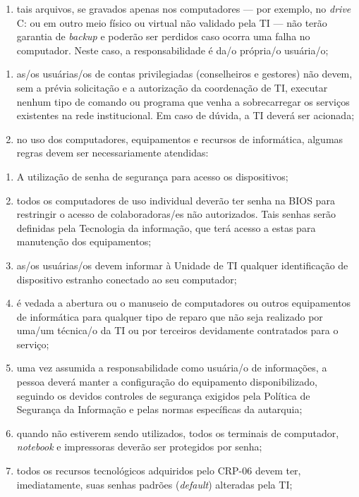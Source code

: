 \documentclass[openright, twoside, a4paper]{memoir}
\begin{document}
\begin{enumerate}
    \begin{enumerate}
      \def\labelenumii{\roman{enumii}.}
      \item
            tais arquivos, se gravados apenas nos computadores --- por exemplo,
            no \emph{drive} C: ou em outro meio físico ou virtual não validado
            pela TI --- não terão garantia de \emph{backup} e poderão ser
            perdidos caso ocorra uma falha no computador. Neste caso, a
            responsabilidade é da/o própria/o usuária/o;
    \end{enumerate}
\end{enumerate}

\begin{enumerate}

\item
    as/os usuárias/os de contas privilegiadas (conselheiros e gestores)
    não devem, sem a prévia solicitação e a autorização da coordenação de
    TI, executar nenhum tipo de comando ou programa que venha a
    sobrecarregar os serviços existentes na rede institucional. Em caso de
    dúvida, a TI deverá ser acionada;
\item
    no uso dos computadores, equipamentos e recursos de informática,
    algumas regras devem ser necessariamente atendidas:
\end{enumerate}

\begin{enumerate}
\def\labelenumi{\roman{enumi}.}
\item
    A utilização de senha de segurança para acesso os dispositivos;
\item
    todos os computadores de uso individual deverão ter senha na BIOS para
    restringir o acesso de colaboradoras/es não autorizados. Tais senhas
    serão definidas pela Tecnologia da informação, que terá acesso a estas
    para manutenção dos equipamentos;
\item
    as/os usuárias/os devem informar à Unidade de TI qualquer
    identificação de dispositivo estranho conectado ao seu computador;
\item
    é vedada a abertura ou o manuseio de computadores ou outros
    equipamentos de informática para qualquer tipo de reparo que não seja
    realizado por uma/um técnica/o da TI ou por terceiros devidamente
    contratados para o serviço;
\item
    uma vez assumida a responsabilidade como usuária/o de informações, a
    pessoa deverá manter a configuração do equipamento disponibilizado,
    seguindo os devidos controles de segurança exigidos pela Política de
    Segurança da Informação e pelas normas específicas da autarquia;
\item
    quando não estiverem sendo utilizados, todos os terminais de
    computador, \emph{notebook} e impressoras deverão ser protegidos por
    senha;
\item
    todos os recursos tecnológicos adquiridos pelo CRP-06 devem ter,
    imediatamente, suas senhas padrões (\emph{default}) alteradas pela TI;
\end{enumerate}
\end{document}
